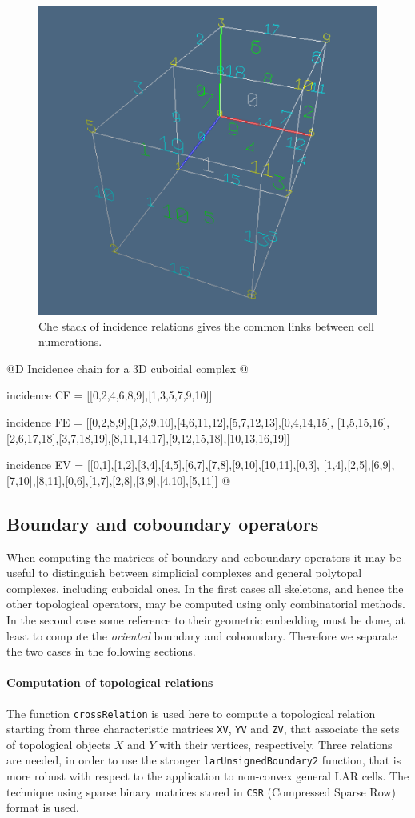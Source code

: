 \documentclass[11pt,oneside]{article}    %
\begin{document}
\begin{figure}[htbp] %
   \centering
   \includegraphics[width=0.5\linewidth]{images/incidenceChain} 
   \caption{Che stack of incidence relations gives the common links between cell numerations.}
   \label{incidenceChain}
\end{figure}


@D Incidence chain for a 3D cuboidal complex
@{incidence CF = [[0,2,4,6,8,9],[1,3,5,7,9,10]]

incidence FE = [[0,2,8,9],[1,3,9,10],[4,6,11,12],[5,7,12,13],[0,4,14,15],
[1,5,15,16],[2,6,17,18],[3,7,18,19],[8,11,14,17],[9,12,15,18],[10,13,16,19]]

incidence EV = [[0,1],[1,2],[3,4],[4,5],[6,7],[7,8],[9,10],[10,11],[0,3],
[1,4],[2,5],[6,9],[7,10],[8,11],[0,6],[1,7],[2,8],[3,9],[4,10],[5,11]]
@}



\subsection{Boundary and coboundary operators}

When computing the matrices of boundary and coboundary operators it may be useful to distinguish between simplicial complexes and general polytopal complexes, including  cuboidal ones. In the first cases all skeletons, and hence the other topological operators, may be computed using only combinatorial methods. In the second case some reference to their geometric embedding must be done, at least to compute the \emph{oriented} boundary and coboundary. Therefore we separate the two cases in the following sections.



\paragraph{Computation of topological relations} 
The function \texttt{crossRelation} is used here to compute a topological relation starting from three characteristic matrices \texttt{XV}, \texttt{YV} and \texttt{ZV}, that associate the sets of topological objects $X$ and $Y$ with their vertices, respectively. 
Three relations are needed, in order to use the stronger \texttt{larUnsignedBoundary2} function, that is more robust with respect to the application to non-convex general LAR cells. 
The technique using sparse binary matrices stored in \texttt{CSR} (Compressed Sparse Row) format is used.
\end{document}
